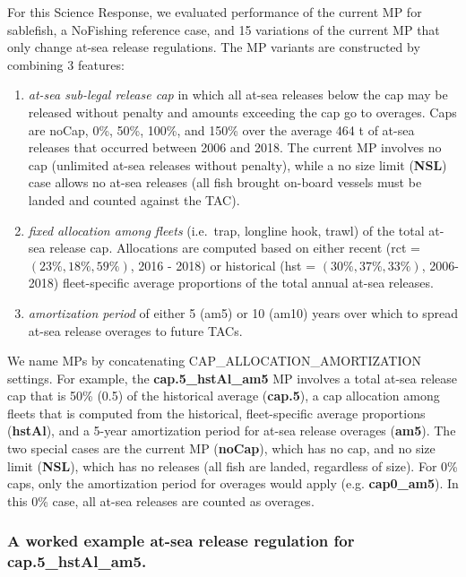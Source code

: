 \documentclass[11pt]{book}
\begin{document}
For this Science Response, we evaluated performance of the current MP for sablefish, a NoFishing reference case, and 15 variations of the current MP that only change at-sea release regulations. The MP variants are constructed by combining 3 features:
\begin{enumerate}
\def\labelenumi{\arabic{enumi}.}

\item
  \emph{at-sea sub-legal release cap} in which all at-sea releases below the cap may be released without penalty and amounts exceeding the cap go to overages. Caps are noCap, 0\%, 50\%, 100\%, and 150\% over the average 464 t of at-sea releases that occurred between 2006 and 2018. The current MP involves no cap (unlimited at-sea releases without penalty), while a no size limit (\textbf{NSL}) case allows no at-sea releases (all fish brought on-board vessels must be landed and counted against the TAC).
\item
  \emph{fixed allocation among fleets} (i.e.~trap, longline hook, trawl) of the total at-sea release cap. Allocations are computed based on either recent (rct = \((23\%, 18\%, 59\%)\), 2016 - 2018) or historical (hst = \((30\%, 37\%, 33\%)\), 2006-2018) fleet-specific average proportions of the total annual at-sea releases.
\item
  \emph{amortization period} of either 5 (am5) or 10 (am10) years over which to spread at-sea release overages to future TACs.
\end{enumerate}
We name MPs by concatenating CAP\_ALLOCATION\_AMORTIZATION settings. For example, the \textbf{cap.5\_hstAl\_am5} MP involves a total at-sea release cap that is 50\% (0.5) of the historical average (\textbf{cap.5}), a cap allocation among fleets that is computed from the historical, fleet-specific average proportions (\textbf{hstAl}), and a 5-year amortization period for at-sea release overages (\textbf{am5}). The two special cases are the current MP (\textbf{noCap}), which has no cap, and no size limit (\textbf{NSL}), which has no releases (all fish are landed, regardless of size). For 0\% caps, only the amortization period for overages would apply (e.g. \textbf{cap0\_am5}). In this 0\% case, all at-sea releases are counted as overages.

\hypertarget{a-worked-example-at-sea-release-regulation-for-cap.5_hstal_am5.}{%
\subsubsection{\texorpdfstring{A worked example at-sea release regulation for \textbf{cap.5\_hstAl\_am5}.}{A worked example at-sea release regulation for cap.5\_hstAl\_am5.}}\label{a-worked-example-at-sea-release-regulation-for-cap.5_hstal_am5.}}
\end{document}
